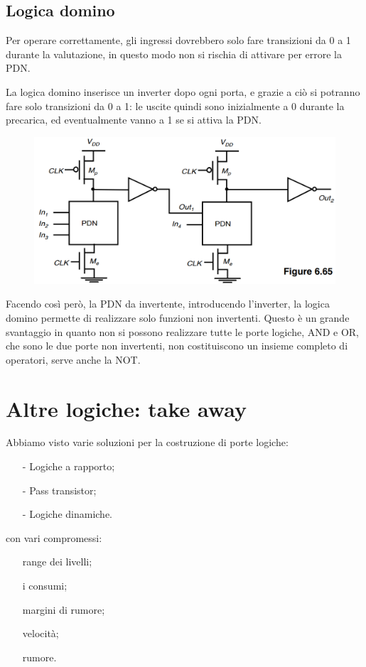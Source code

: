 \newpage
\subsection{Logica domino}
Per	operare correttamente,	gli ingressi dovrebbero solo	fare	transizioni da	0	a	1	durante la	valutazione, in	questo modo non	si rischia di	attivare per	errore la	PDN.

La	logica domino	inserisce un	inverter	dopo ogni porta, e grazie a ciò si potranno fare solo transizioni da 0 a 1: le	uscite quindi sono inizialmente a	0	durante la	precarica, ed	eventualmente vanno a	1	se	si attiva la	PDN.


\begin{figure}[htbp]
    \centering
    \includegraphics[width=0.6\linewidth]{img/logica_domino.png}
    
    
\end{figure}

Facendo così però, la PDN da invertente, introducendo l'inverter,	la	logica domino	permette di	realizzare solo	funzioni non	invertenti. Questo è un grande svantaggio in quanto non si possono realizzare tutte le porte logiche, AND e OR, che sono le due porte non invertenti, non costituiscono un insieme  completo di operatori, serve anche la NOT.


\section{Altre logiche: take away}

Abbiamo visto varie soluzioni per la costruzione di porte logiche:

\begin{itemize}
    \item[-] Logiche	a	rapporto;
    \item[-] Pass	transistor;
    \item[-] Logiche	dinamiche.
\end{itemize}

con vari compromessi: 
\begin{itemize}
    \item[] range dei livelli;
    \item[] i consumi;
    \item[] margini di rumore;
    \item[] velocità;
    \item[] rumore.
\end{itemize}

